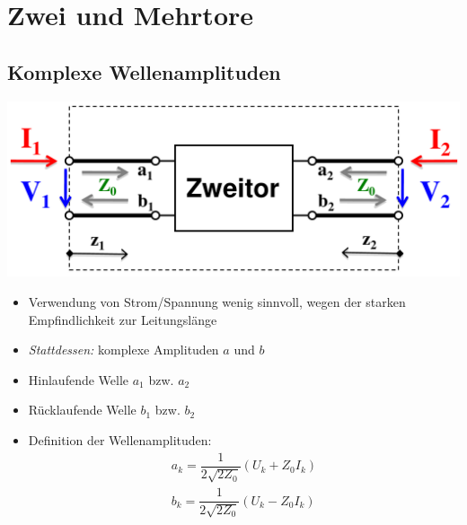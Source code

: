 \vspace{1cm}
{\small%
\section{Zwei und Mehrtore}
\subsection{Komplexe Wellenamplituden}
\includegraphics[width= 0.35\paperheight]{content/fuw/pictures/hf_zweitor.png}
    \begin{itemize}
        \itemsep0pt
        \item Verwendung von Strom/Spannung wenig sinnvoll, wegen der starken Empfindlichkeit zur Leitungslänge
        \item \textit{Stattdessen:} komplexe Amplituden $a$ und $b$
        \item Hinlaufende Welle $a_1$ bzw. $a_2$
        \item Rücklaufende Welle $b_1$ bzw. $b_2$
        \item Definition der Wellenamplituden:
        \begin{align*}
            a_k  = \dfrac{1}{2\sqrt{2 Z_0}}(U_k + Z_0 I_k)\\
            b_k  = \dfrac{1}{2\sqrt{2 Z_0}}(U_k - Z_0 I_k)
        \end{align*}
\end{itemize}
}

